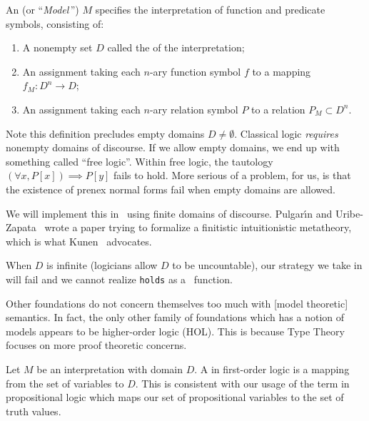 \begin{node}[Semantics]\label{fol-0005}%
\begin{definition}\label{fol-0006}%
An  (or ``\textit{Model}\,'') $M$ specifies the
interpretation of function and predicate symbols, consisting of:
\begin{enumerate}
\item A nonempty set $D$ called the  of the interpretation;
\item An assignment taking each $n$-ary function symbol $f$ to a mapping
  $f_{M}\colon D^{n}\to D$;
\item An assignment taking each $n$-ary relation symbol $P$ to a
  relation $P_{M}\subset D^{n}$.
\end{enumerate}
\begin{node}\label{fol-000A}%
Note this definition precludes empty domains $D\neq\emptyset$. Classical
logic \emph{requires} nonempty domains of discourse. If we allow empty
domains, we end up with something called ``free logic''. Within free
logic, the tautology $(\forall x,P[x])\implies P[y]$ fails to hold.
More serious of a problem, for us, is that the existence of prenex
normal forms fail when empty domains are allowed.
\end{node}

\begin{node}\label{fol-000B}%
We will implement this in \SML\ using finite domains of discourse.
Pulgar\'{\i}n and Uribe-Zapata~\cite{pulgarin2023came} wrote a paper
trying to formalize a finitistic intuitionistic metatheory, which is
what Kunen~\cite{kunen2009foundations} advocates.

When $D$ is infinite (logicians allow $D$ to be uncountable), our
strategy we take in  will fail and we cannot realize
\texttt{holds} as a \SML\ function.
\end{node}

\begin{node}\label{fol-000C}%
Other foundations do not concern themselves too much with
[model theoretic] semantics. In fact, the only other family of
foundations which has a notion of models appears to be higher-order
logic (HOL). This is because Type Theory focuses on more proof theoretic
concerns. 
\end{node}
\end{definition}

\begin{definition}\label{fol-0007}%
Let $M$ be an interpretation with domain $D$. A  in
first-order logic is a mapping from the set of variables to $D$.
This is consistent with our usage of the term in propositional logic
 which maps our set of propositional variables to the
set of truth values.
\end{definition}


\end{node}
